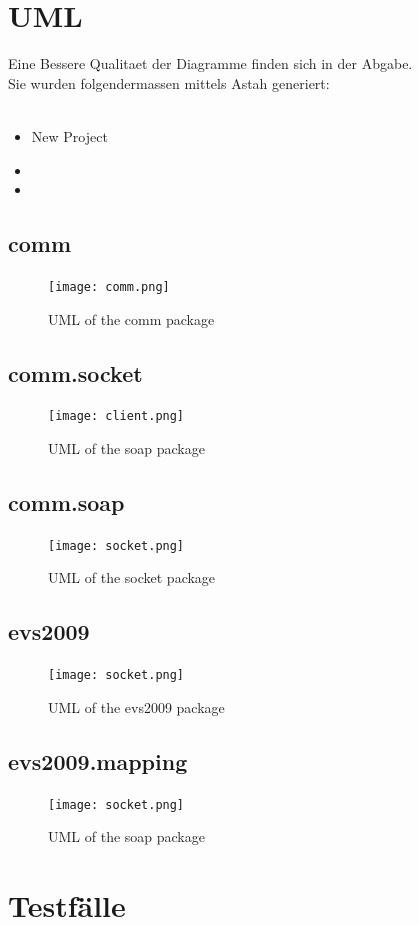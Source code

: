 \documentclass[a4paper]{article}
\begin{document}
\section{UML}
Eine Bessere Qualitaet der Diagramme finden sich in der Abgabe. \\ Sie wurden folgendermassen mittels Astah generiert: \\ \\
\begin{itemize}
\item New Project 
\item 
\item
\end{itemize}
	\subsection{comm}
	\begin{figure}[here!]
	\centering
	\texttt{[image: comm.png]}
	\caption{UML of the comm package}
	\end{figure}
	\subsection{comm.socket}
	\begin{figure}[here!]
	\centering
	\texttt{[image: client.png]}
	\caption{UML of the soap package}
	\end{figure}
	\subsection{comm.soap}
	\begin{figure}[here!]
	\centering
	\texttt{[image: socket.png]}
	\caption{UML of the socket package}
	\end{figure}
	\subsection{evs2009}
	\begin{figure}[here!]
	\centering
	\texttt{[image: socket.png]}
	\caption{UML of the evs2009 package}
	\end{figure}
	\subsection{evs2009.mapping}
	\begin{figure}[here!]
	\centering
	\texttt{[image: socket.png]}
	\caption{UML of the soap package}
	\end{figure}
\section{Testfälle}
\end{document}
